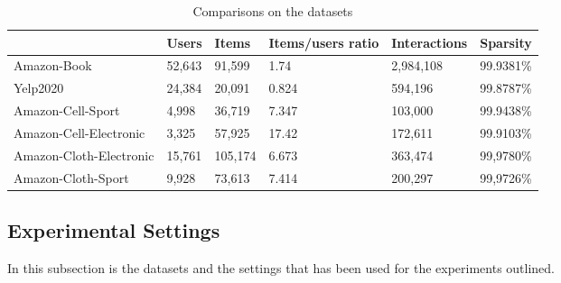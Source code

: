 \begin{table*}[h!]
    \scriptsize
    \centering
    \begin{tabular}{|l|l|l|l|l|l|}
        \hline
                                & Users  & Items   & Items/users ratio & Interactions & Sparsity  \\ \hline
        Amazon-Book             & 52,643 & 91,599  & 1.74              & 2,984,108    & 99.9381\% \\ \hline
        Yelp2020                & 24,384 & 20,091  & 0.824             & 594,196      & 99.8787\% \\ \hline
        Amazon-Cell-Sport       & 4,998  & 36,719  & 7.347             & 103,000      & 99.9438\% \\ \hline
        Amazon-Cell-Electronic  & 3,325  & 57,925  & 17.42             & 172,611      & 99.9103\% \\ \hline
        Amazon-Cloth-Electronic & 15,761 & 105,174 & 6.673             & 363,474      & 99,9780\% \\ \hline
        Amazon-Cloth-Sport      & 9,928  & 73,613  & 7.414             & 200,297      & 99,9726\% \\ \hline
    \end{tabular}
    \caption{Comparisons on the datasets}
    \label{tab:dataset-comparison}
\end{table*}


\subsection{Experimental Settings}

In this subsection is the datasets and the settings that has been used for the experiments outlined.




